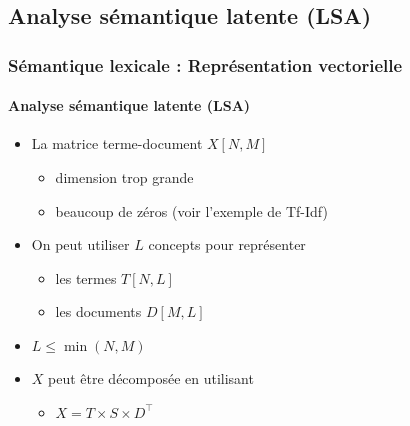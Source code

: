 \documentclass[xcolor=table]{beamer}
\begin{document}
\subsection{Analyse sémantique latente (LSA)}

\begin{frame}
\frametitle{Sémantique lexicale : Représentation vectorielle}
\framesubtitle{Analyse sémantique latente (LSA)}

\begin{itemize}
	\item La matrice terme-document $X[N, M]$ 
	\begin{itemize}
		\item dimension trop grande
		\item beaucoup de zéros (voir l'exemple de Tf-Idf)
	\end{itemize}
	\item On peut utiliser $L$ concepts pour représenter
	\begin{itemize}
		\item les termes $T[N, L]$
		\item les documents $D[M, L]$
	\end{itemize}
	\item $L \le \min(N, M)$
	\item $X$ peut être décomposée en utilisant 
	\begin{itemize}
		\item $X = T \times S \times D^\top$
	\end{itemize}
\end{itemize}

\end{frame}
\end{document}
